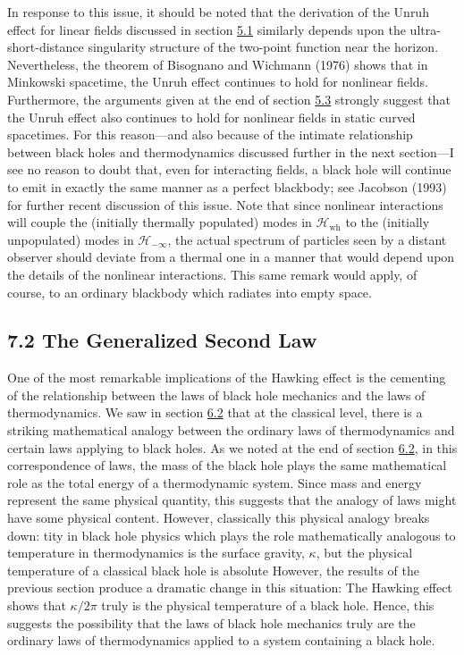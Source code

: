 \documentclass[11pt,a4paper]{article}
\begin{document}
In response to this issue, it should be noted that the derivation of the Unruh effect for linear fields discussed in section \hyperlink{sec:5.1}{5.1} similarly depends upon the ultra-short-distance singularity structure of the two-point function near the horizon. Nevertheless, the theorem of Bisognano and Wichmann (1976) shows that in Minkowski spacetime, the Unruh effect continues to hold for nonlinear fields. Furthermore, the arguments given at the end of section \hyperlink{sec:5.3}{5.3} strongly suggest that the Unruh effect also continues to hold for nonlinear fields in static curved spacetimes. For this reason---and also because of the intimate relationship between black holes and thermodynamics discussed further in the next section---I see no reason to doubt that, even for interacting fields, a black hole will continue to emit in exactly the same manner as a perfect blackbody; see \hypertarget{source-176}{} Jacobson (1993) for further recent discussion of this issue. Note that since nonlinear interactions will couple the (initially thermally populated) modes in \(\mathcal{H}_{\text{wh}}\) to the (initially unpopulated) modes in \(\mathcal{H}_{-\infty}\), the actual spectrum of particles seen by a distant observer should deviate from a thermal one in a manner that would depend upon the details of the nonlinear interactions. This same remark would apply, of course, to an ordinary blackbody which radiates into empty space.

\subsection*{7.2 The Generalized Second Law}\hypertarget{sec:7.2}{}

One of the most remarkable implications of the Hawking effect is the cementing of the relationship between the laws of black hole mechanics and the laws of thermodynamics. We saw in section \hyperlink{sec:6.2}{6.2} that at the classical level, there is a striking mathematical analogy between the ordinary laws of thermodynamics and certain laws applying to black holes. As we noted at the end of section \hyperlink{sec:6.2}{6.2}, in this correspondence of laws, the mass of the black hole plays the same mathematical role as the total energy of a thermodynamic system. Since mass and energy represent the same physical quantity, this suggests that the analogy of laws might have some physical content. However, classically this physical analogy breaks down: tity in black hole physics which plays the role mathematically analogous to temperature in thermodynamics is the surface gravity, \(\kappa\), but the physical temperature of a classical black hole is absolute However, the results of the previous section produce a dramatic change in this situation: The Hawking effect shows that \(\kappa/2\pi\) truly is the physical temperature of a black hole. Hence, this suggests the possibility that the laws of black hole mechanics truly are the ordinary laws of thermodynamics applied to a system containing a black hole.
\end{document}
